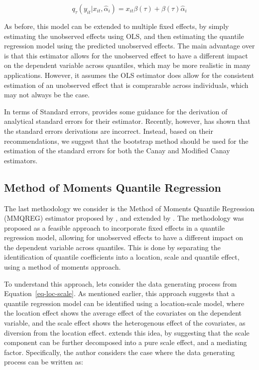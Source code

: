 \documentclass[bib]{statapress}
\begin{document}
\[q_{\tau}(y_{it}|x_{it},\hat \alpha_i) =  x_{it}\beta(\tau)+\beta(\tau) \hat\alpha_i
\]

As before, this model can be extended to multiple fixed effects, by
simply estimating the unobserved effects using OLS, and then estimating
the quantile regression model using the predicted unobserved effects.
The main advantage over \citet{canay2011} is that this estimator allows
for the unobserved effect to have a different impact on the dependent
variable across quantiles, which may be more realistic in many
applications. However, it assumes the OLS estimator does allow for the
consistent estimation of an unobserved effect that is comprarable across
individuals, which may not always be the case.

In terms of Standard errors, \citet{canay2011} provides some guidance
for the derivation of analytical standard errors for their estimator.
Recently, however, \citet{besstremyannaya2019} has shown that the
standard errors derivations are incorrect. Instead, based on their
recommendations, we suggest that the bootstrap method should be used for
the estimation of the standard errors for both the Canay and Modified
Canay estimators.

\subsection{\texorpdfstring{Method of Moments Quantile Regression
\citet{mss2019}}{Method of Moments Quantile Regression @mss2019}}\label{sec-mmqr}

The last methodology we consider is the Method of Moments Quantile
Regression (MMQREG) estimator proposed by \citet{mss2019}, and extended
by \citet{riosavila2024}. The methodology was proposed as a feasible
approach to incorporate fixed effects in a quantile regression model,
allowing for unobserved effects to have a different impact on the
dependent variable across quantiles. This is done by separating the
identification of quantile coefficients into a location, scale and
quantile effect, using a method of moments approach.

To understand this approach, lets consider the data generating process
from Equation~\ref{eq-loc-scale}. As mentioned earlier, this approach
suggests that a quantile regression model can be identified using a
location-scale model, where the location effect shows the average effect
of the covariates on the dependent variable, and the scale effect shows
the heterogenous effect of the covariates, as diversion from the
location effect. \citet{mss2019} extends this idea, by suggesting that
the scale component can be further decomposed into a pure scale effect,
and a mediating factor. Specifically, the author considers the case
where the data generating process can be written as:
\end{document}
